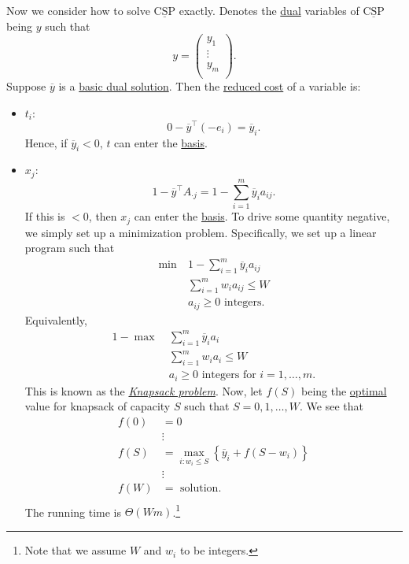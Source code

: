\begin{answer}
	Now we consider how to solve \(\mathrm{\underline{CSP}}\) exactly. Denotes the \hyperref[def:dual]{dual} variables of \(\mathrm{\underline{CSP}}\) being \(y\) such that
	\[
		y = \begin{pmatrix}
			y_1    \\
			\vdots \\
			y_{m}  \\
		\end{pmatrix}.
	\]
	Suppose \(\overline{y}\) is a \hyperref[def:dual-basic-solution]{basic dual solution}. Then the \hyperref[def:reduced-cost]{reduced cost} of a variable is:
	\begin{itemize}
		\item \(t_{i}\):
		      \[
			      0 - \overline{y}^{\top}(-e_{i}) = \overline{y}_{i}.
		      \]
		      Hence, if \(\overline{y}_{i}<0\), \(t\) can enter the \hyperref[def:basis]{basis}.
		\item \(x_{j}\):
		      \[
			      1 - \overline{y}^{\top}A_{\cdot j} = 1 - \sum\limits_{i=1}^{m} \overline{y}_{i}a_{ij}.
		      \]
		      If this is \(<0\), then \(x_{j}\) can enter the \hyperref[def:basis]{basis}. To drive some quantity negative, we simply set up a minimization problem. Specifically, we set up a linear program such that
		      \[
			      \begin{aligned}
				      \min~ & 1 - \sum\limits_{i=1}^{m} \overline{y}_{i}a_{ij} \\
				            & \sum\limits_{i=1}^{m} w_{i}a_{ij}\leq W          \\
				            & a_{ij}\geq 0 \text{ integers}.
			      \end{aligned}
		      \]
		      Equivalently,
		      \[
			      \begin{aligned}
				      1 - \max~ & \sum\limits_{i=1}^{m} \overline{y}_{i}a_{i}        \\
				                & \sum\limits_{i=1}^{m} w_{i}a_{i}\leq W             \\
				                & a_{i}\geq 0 \text{ integers for }i = 1, \dots , m.
			      \end{aligned}
		      \]
		      This is known as the \emph{\href{https://en.wikipedia.org/wiki/Knapsack_problem}{Knapsack problem}}. Now, let \(f(S)\) being the \hyperref[def:optimal-solution]{optimal} value for knapsack of capacity \(S\) such that \(S = 0, 1, \dots , W\). We see that
		      \[
			      \begin{split}
				      f(0) &= 0\\
				      &\vdots\\
				      f(S) &= \max_{i\colon w_{i}\leq S}\left\{ \overline{y}_{i} + f(S - w_{i})\right\}\\
				      &\vdots\\
				      f(W) &= \text{ solution}.\\
			      \end{split}
		      \]
		      The running time is \(\Theta(Wm)\).\footnote{Note that we assume \(W\) and \(w_{i}\) to be integers.}


\end{itemize}
\end{answer}
